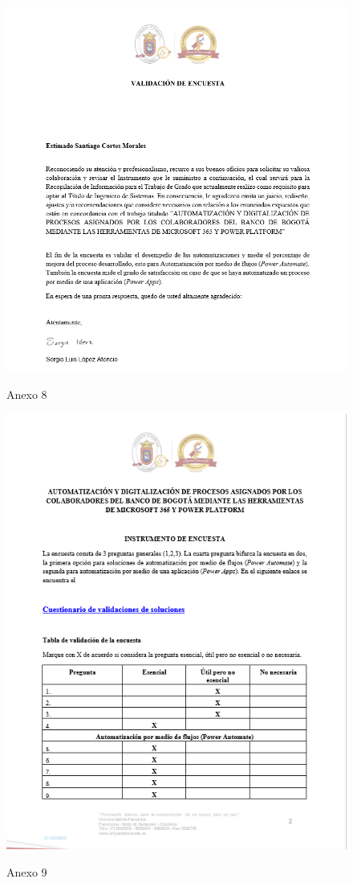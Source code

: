 \begin{figure}[H]
	\centering
	\includegraphics[scale=0.4]{Capitulo6/8}
	\label{anexo8}
	\caption{Anexo 8}
\end{figure}

\begin{figure}[H]
	\centering
	\includegraphics[scale=0.4]{Capitulo6/9}
	\label{anexo9}
	\caption{Anexo 9}
\end{figure}

